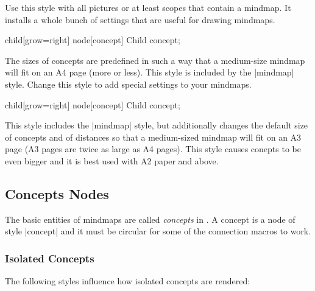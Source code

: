 \begin{itemize}
  Use this style with all pictures or at least scopes that contain a
  mindmap. It installs a whole bunch of settings that are useful for
  drawing mindmaps. 
\begin{codeexample}[]
\tikz[mindmap,concept color=red!50]
    child[grow=right] {node[concept] {Child concept}};
\end{codeexample}
  The sizes of concepts are predefined in such a way that a
  medium-size mindmap will fit on an A4 page (more or less).  
  This style is included by the |mindmap| style. Change this style to
  add special settings to your mindmaps.
\begin{codeexample}[]
\tikz[large mindmap,concept color=red!50]
    child[grow=right] {node[concept] {Child concept}};
\end{codeexample}
  This style includes the |mindmap| style, but additionally changes
  the default size of concepts and of distances so that a medium-sized
  mindmap will fit on an A3 page (A3 pages are twice as large as A4
  pages).
  This style causes conepts to be even bigger and it is best used with
  A2 paper and above.
\end{itemize}

\subsection{Concepts Nodes}

The basic entities of mindmaps are called \emph{concepts} in
\tikzname. A concept is a node of style |concept| and it must be
circular for some of the connection macros to work.


\subsubsection{Isolated Concepts}

The following styles influence how isolated concepts are rendered:

